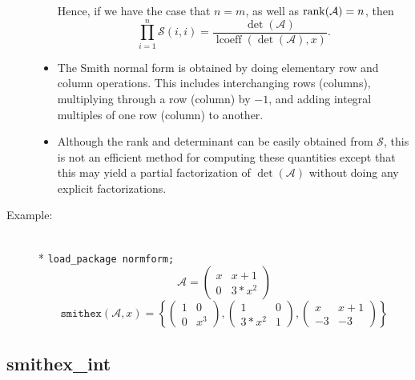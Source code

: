 \begin{description}
\begin{itemize}
      Hence, if we have the case that $n = m$, as well as
      $\mathop{\mathrm{rank}}(\mathcal{A}) = n$, then
      \[
      \prod_{i=1}^{n} \mathcal{ S}(i,i) =
      \frac{\det(\mathcal{A})} { \mathop{\mathrm{lcoeff}}(\det(\mathcal{A}),x)}.
      \]

\item The Smith normal form is obtained by doing elementary row and
      column operations. This includes interchanging rows (columns),
      multiplying through a row (column) by $-1$, and adding integral
      multiples of one row (column) to another.

\item Although the rank and determinant can be easily obtained from
      $\mathcal{S}$, this is not an efficient method for computing these
      quantities except that this may yield a partial factorization of
      $\det(\mathcal{A})$ without doing any explicit factorizations.

\end{itemize}

\item[Example:]\mbox{}\\*
\texttt{load\_package normform;}
\[
 \mathcal{A} = \begin{pmatrix} x & x+1 \\ 0 & 3*x^2 \end{pmatrix}
\]
\[
 \mathtt{smithex}(\mathcal{A}, x)  =
  \left\{
    \begin{pmatrix} 1 & 0 \\ 0 & x^3 \end{pmatrix},
    \begin{pmatrix} 1 & 0 \\ 3*x^2 & 1 \end{pmatrix},
    \begin{pmatrix} x & x+1 \\ -3 & -3 \end{pmatrix}
  \right\}
\]
\end{description}

\subsection{smithex\_int}

